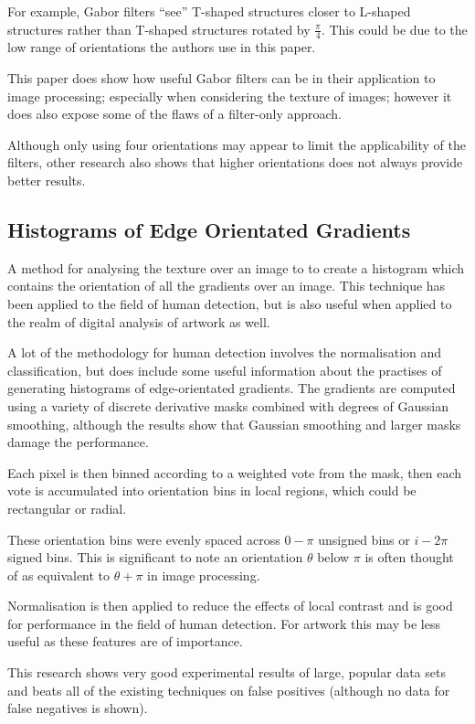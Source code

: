\documentclass[conference]{IEEEtran}
\begin{document}
For example, Gabor filters ``see'' T-shaped structures closer to L-shaped
structures rather than T-shaped structures rotated by $\frac{\pi}{4}$. This
could be due to the low range of orientations the authors use in this paper.

This paper does show how useful Gabor filters can be in their application to
image processing; especially when considering the texture of images; however it
does also expose some of the flaws of a filter-only approach.

Although only using four orientations may appear to limit the applicability of
the filters, other research\cite{brown13can} also shows that higher
orientations does not always provide better results.

\subsection{Histograms of Edge Orientated Gradients}

A method for analysing the texture over an image to to create a histogram which
contains the orientation of all the gradients over an image. This technique has
been applied to the field of human detection\cite{dalal05histograms}, but is
also useful when applied to the realm of digital analysis of artwork as well.

A lot of the methodology for human detection involves the normalisation and
classification, but does include some useful information about the practises of
generating histograms of edge-orientated gradients. The gradients are computed
using a variety of discrete derivative masks combined with degrees of Gaussian
smoothing, although the results show that Gaussian smoothing and larger masks
damage the performance.

Each pixel is then binned according to a weighted vote from the mask, then each
vote is accumulated into orientation bins in local regions, which could be
rectangular or radial.

These orientation bins were evenly spaced across $0-\pi$ unsigned bins or
$i-2\pi$ signed bins. This is significant to note an orientation $\theta$ below
$\pi$ is often thought of as equivalent to $\theta + \pi$ in image processing.

Normalisation is then applied to reduce the effects of local contrast and is
good for performance in the field of human detection. For artwork this may be
less useful as these features are of importance.

This research shows very good experimental results of large, popular data sets
and beats all of the existing techniques on false positives (although no data
for false negatives is shown).
\end{document}
